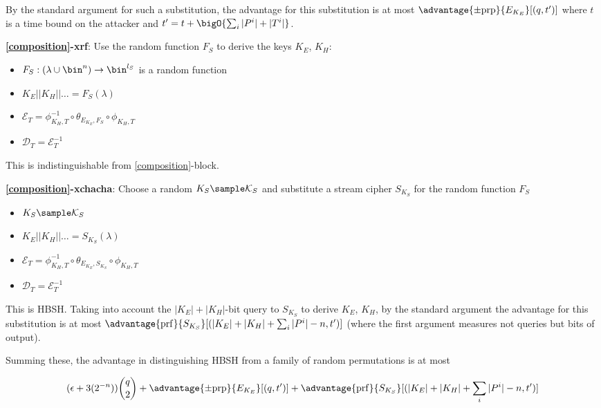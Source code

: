 \documentclass[journal=tosc,preprint,floatrow,submission]{iacrtrans}
\newcommand*{\xprm}[2]{\textsf{\ref*{#1}-#2}}
\newcommand*{\xprmtitle}[2]{\textbf{\xprm{#1}{#2}}}
\newcommand*{\calE}{\mathcal{E}}
\newcommand*{\calD}{\mathcal{D}}
\begin{document}
By the standard argument
for such a substitution, the advantage for this substitution is at most
$\advantage{\pm \mathrm{prp}}{E_{K_E}}[(q, t')]$ where $t$ is a time bound on the attacker and
$t' = t + \bigO{\sum_i |P^i| + |T^i|}$.

\xprmtitle{composition}{xrf}: Use the random function $F_S$ to derive the keys
$K_E$, $K_H$:

\begin{itemize}
    \item $F_S: (\lambda \cup \bin^n) \rightarrow \bin^{l_S}$ is a random function
    \item $K_E || K_H || \ldots = F_S(\lambda)$
    \item $\calE_T = \phi^{-1}_{K_H, T} \circ \theta_{E_{K_E}, F_S} \circ \phi_{K_H, T}$
    \item $\calD_T = \calE_T^{-1}$
\end{itemize}

This is indistinguishable from \xprm{composition}{block}.

\xprmtitle{composition}{xchacha}: Choose a random $K_S \sample \mathcal{K}_S$ and
substitute a stream cipher $S_{K_S}$ for the random function $F_S$

\begin{itemize}
    \item $K_S \sample \mathcal{K}_S$
    \item $K_E || K_H || \ldots = S_{K_S}(\lambda)$
    \item $\calE_T = \phi^{-1}_{K_H, T} \circ \theta_{E_{K_E}, S_{K_S}} \circ \phi_{K_H, T}$
    \item $\calD_T = \calE_T^{-1}$
\end{itemize}

This is HBSH. Taking into account the $|K_E| + |K_H|$-bit
query to $S_{K_S}$ to derive $K_E$, $K_H$,
by the standard argument the advantage for this substitution is at most
$\advantage{\mathrm{prf}}{S_{K_S}}[(|K_E| + |K_H| + \sum_i |P^i|-n, t')]$ (where
the first argument measures not queries but bits of output).

Summing these,
the advantage in distinguishing HBSH from a family of random permutations is at most

\begin{displaymath}
(\epsilon + 3(2^{-n}))\binom{q}{2}
+ \advantage{\pm \mathrm{prp}}{E_{K_E}}[(q, t')]
+ \advantage{\mathrm{prf}}{S_{K_S}}[(|K_E| + |K_H| + \sum_i |P^i|-n, t')]
\end{displaymath}
\end{document}
